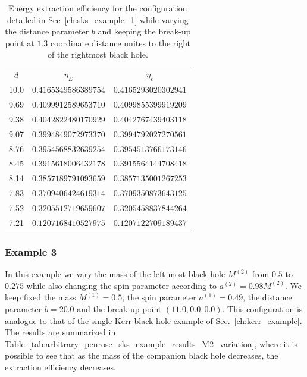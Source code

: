 \begin{table}[]
  \centering
  \begin{tabular}{ccc}
    \hline\hline
    $d$  & $\eta_E$             & $\eta_\varepsilon$   \\
    10.0 & $0.4165349586389754$ & $0.4165293020302941$ \\
    9.69 & $0.4099912589653710$ & $0.4099855399919209$ \\
    9.38 & $0.4042822480170929$ & $0.4042767439403118$ \\
    9.07 & $0.3994849072973370$ & $0.3994792027270561$ \\
    8.76 & $0.3954568832639254$ & $0.3954513766173146$ \\
    8.45 & $0.3915618006432178$ & $0.3915564144708418$ \\
    8.14 & $0.3857189791093659$ & $0.3857135001267253$ \\
    7.83 & $0.3709406424619314$ & $0.3709350873643125$ \\
    7.52 & $0.3205512719659607$ & $0.3205458837844264$ \\
    7.21 & $0.1207168410527975$ & $0.1207122709189437$ \\ \hline\hline
  \end{tabular}
  \caption{Energy extraction efficiency for the configuration detailed in Sec~\ref{ch:sks_example_1} while varying the distance parameter $b$ and keeping the break-up point at $1.3$ coordinate distance unites to the right of the rightmost black hole.}
  \label{tab:arbitrary_penrose_sks_example_results_d_variation}
\end{table}

\subsubsection{Example 3}
\label{ch:sks_example_3}

In this example we vary the mass of the left-most black hole $M^{(2)}$ from $0.5$ to $0.275$ while also changing the spin parameter according to $a^{(2)} = 0.98 M^{(2)}$. We keep fixed the mass $M^{(1)} = 0.5$, the spin parameter $a^{(1)} = 0.49$, the distance parameter $b=20.0$ and the break-up point $(11.0, 0.0, 0.0)$. This configuration is analogue to that of the single Kerr black hole example of Sec.~\ref{ch:kerr_example}. The results are summarized in Table~\ref{tab:arbitrary_penrose_sks_example_results_M2_variation}, where it is possible to see that as the mass of the companion black hole decreases, the extraction efficiency decreases.

